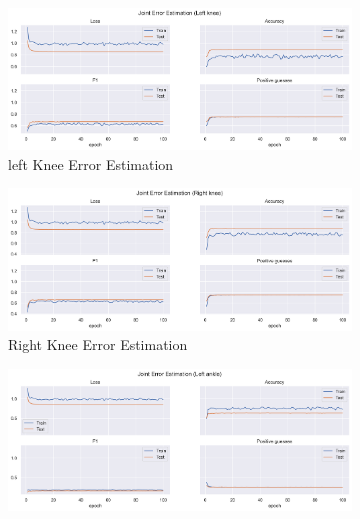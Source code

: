   
  \begin{figure}[!ht]
    \centering
    \begin{subfigure}[b]{0.47\linewidth}
        \centering
        \includegraphics[width=\textwidth]{figures/Results/v2_bs_40_is_64_e_100/jt/Left knee_ErrorEstimation.png}
        \caption{left Knee Error Estimation}
        \label{fig:v2_lekn_jt_ee}
    \end{subfigure}
    \hfill
    \begin{subfigure}[b]{0.47\linewidth}
        \centering
        \includegraphics[width=\textwidth]{figures/Results/v2_bs_40_is_64_e_100/jt/Right knee_ErrorEstimation.png}
        \caption{Right Knee Error Estimation}
        \label{fig:v2_rikn_jt_ee}
    \end{subfigure}
    \hfill
    \begin{subfigure}[b]{0.47\linewidth}
        \centering
        \includegraphics[width=\textwidth]{figures/Results/v2_bs_40_is_64_e_100/jt/Left ankle_ErrorEstimation.png}

\end{subfigure}
\end{figure}
